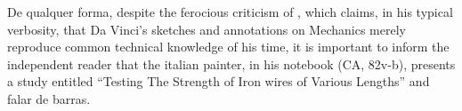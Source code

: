  De qualquer forma, despite the ferocious criticism of \cite{truesdell_1968}, which claims, in his typical verbosity, that Da Vinci's sketches and annotations on Mechanics merely reproduce common technical knowledge of his time, it is important to inform the independent reader that the italian painter, in his notebook (CA, 82v-b), presents a study entitled ``Testing The Strength of Iron wires of Various Lengths'' and falar de barras.     